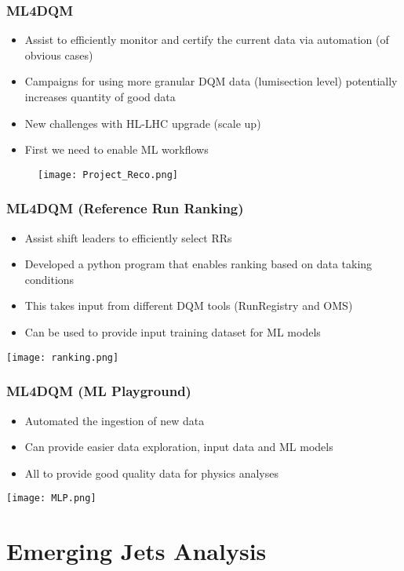 \documentclass[aspectratio=1610]{beamer}
\begin{document}
\begin{frame}
	\frametitle{ML4DQM}

	\begin{itemize}
		\item Assist to efficiently monitor and certify the current data via automation (of obvious cases)
		\item Campaigns for using more granular DQM data (lumisection level) potentially increases quantity of good data
		\item New challenges with HL-LHC upgrade (scale up)
		\item First we need to enable ML workflows
	\end{itemize}
	\begin{figure}
		\centering
		\texttt{[image: Project\_Reco.png]}
	\end{figure}

\end{frame}

\begin{frame}
	\frametitle{ML4DQM (Reference Run Ranking)}
	\begin{itemize}
		\item Assist shift leaders to efficiently select RRs
		\item Developed a python program that enables ranking based on data taking conditions
		\item This takes input from different DQM tools (RunRegistry and OMS)
		\item Can be used to provide input training dataset for ML models
	\end{itemize}
	\texttt{[image: ranking.png]}
\end{frame}

\begin{frame}
	\frametitle{ML4DQM (ML Playground)}
	\begin{itemize}
		\item Automated the ingestion of new data
		\item Can provide easier data exploration, input data and ML models
		\item All to provide good quality data for physics analyses
	\end{itemize}
	\texttt{[image: MLP.png]}
\end{frame}

\section{Emerging Jets Analysis}
\end{document}

